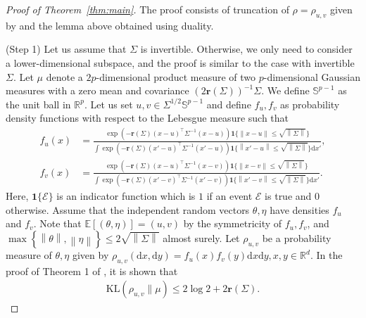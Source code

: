 \documentclass[11pt,a4paper]{article}
\theoremstyle{remark}
\theoremstyle{definition}
\theoremstyle{definition}
\newcommand{\Ep}{\mathbb{E}}
\newcommand{\mE}{\mathcal{E}}
\newcommand{\rc}{\color{black}}
\begin{document}
\begin{bibunit}[apalike]
\begin{proof}[Proof of Theorem~\ref{thm:main}]
The proof consists of truncation of $\rho=\rho_{u,v}$ given by \citep{zhivotovskiy2021dimension} and the lemma above obtained using duality.

(Step 1) 
Let us assume that $\Sigma$ is invertible. Otherwise, we only need to consider a lower-dimensional subspace, and the proof is similar to the case with invertible $\Sigma$.
Let $\mu$ denote a $2p$-dimensional product measure of two $p$-dimensional Gaussian measures with a zero mean and covariance $\left(2\mathbf{r}\left(\Sigma\right)\right)^{-1}\Sigma$.
We define $\mathbb{S}^{p-1}$ as the unit ball in $\mathbb{R}^{p}$.
Let us set $u,v\in\Sigma^{1/2}\mathbb{S}^{p-1}$ and define $f_{u},f_{v}$ as probability density functions with respect to the Lebesgue measure such that
\begin{align*}
    f_{u}\left(x\right)&=\frac{\exp\left(-\mathbf{r}\left(\Sigma\right)\left(x-u\right)^{\top}\Sigma^{-1}\left(x-u\right)\right)\mathbf{1}\{\left\|x-u\right\|\le \sqrt{\left\|\Sigma\right\|}\}}{ \int \exp\left(-\mathbf{r}\left(\Sigma\right)\left(x'-u\right)^{\top}\Sigma^{-1}\left(x'-u\right)\right)\mathbf{1}\{\left\|x'-u\right\|\le \sqrt{\left\|\Sigma\right\|}\} \mathrm{d}x'},\\
    f_{v}\left(x\right)&=\frac{\exp\left(-\mathbf{r}\left(\Sigma\right)\left(x-u\right)^{\top}\Sigma^{-1}\left(x-v\right)\right)\mathbf{1}\{\left\|x-v\right\|\le \sqrt{\left\|\Sigma\right\|}\}}{ \int \exp\left(-\mathbf{r}\left(\Sigma\right)\left(x'-v\right)^{\top}\Sigma^{-1}\left(x'-v\right)\right)\mathbf{1}\{\left\|x'-v\right\|\le \sqrt{\left\|\Sigma\right\|}\} \mathrm{d}x'}.
\end{align*}
Here, $\mathbf{1}\{\mE\}$ is an indicator function which is $1$ if an event $\mE$ is true and $0$ otherwise.
Assume that the independent random vectors $\theta,\eta$ have densities $f_{u}$ and $f_{v}$.
{\rc Note that} $\Ep[\left(\theta,\eta\right)]=\left(u,v\right)$ by the symmetricity of $f_{u},f_{v}$, and $\max\left\{\left\|\theta\right\|,\left\|\eta\right\|\right\}\le 2\sqrt{\left\|\Sigma\right\|}$ almost surely.
Let $\rho_{u,v}$ be a probability measure of $\theta,\eta$ given by $\rho_{u,v}(\mathrm{d}x,\mathrm{d}y)=f_{u}\left(x\right)f_{v}\left(y\right)\mathrm{d}x\mathrm{d}y,x,y\in\mathbb{R}^{d}$. 
In the proof of Theorem 1 of \citep{zhivotovskiy2021dimension},
it is shown that
\begin{align*}
    \mathrm{KL}\left(\rho_{u,v} \| \mu\right)\le 2\log2+2\mathbf{r}\left(\Sigma\right).
\end{align*}



\end{proof}
\end{bibunit}
\end{document}
